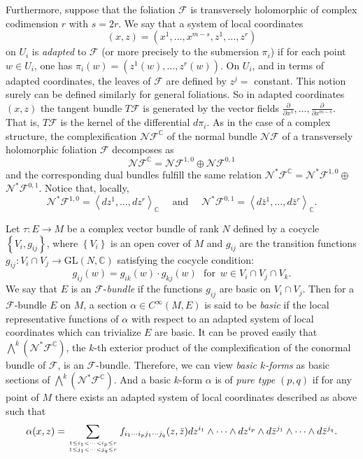 \documentclass[12pt]{amsart}
\numberwithin{equation}{section}
\theoremstyle{definition}
\theoremstyle{definition}
\theoremstyle{definition}
\renewcommand{\1}{\mathsf{1}}
\renewcommand{\>}{\rightarrow}
\def\b{\bar}
\def\mb{\mathbb}
\def\mc{\mathcal}
\theoremstyle{plain} %
\theoremstyle{plain} %
\theoremstyle{plain} %
\begin{document}
	Furthermore,  suppose that  the foliation $\mathcal{F}$ is transversely holomorphic of complex codimension $r$ with $s=2r$. We say that a system of local coordinates  $$(x,z)=\left(x^{1}, \ldots, x^{m-s}, z^{1}, \ldots, z^{r}\right)$$  on $U_i$ is  \textit{adapted} to $\mc F$ (or more precisely to the submersion $\pi_{i}$) if for each point $w\in U_i$, one has $\pi_{i}(w)=\left(z^1(w),\ldots, z^{r}(w)\right)$. On $U_{i}$, and in terms of adapted coordinates, the leaves of $\mathcal{F}$ are defined by $z^{j}=$ constant.
	This notion surely can be defined similarly for general foliations. So in adapted coordinates $(x, z)$ the tangent bundle $T \mathcal{F}$ is generated by the vector fields $\frac{\partial}{\partial x^{1}}, \ldots, \frac{\partial}{\partial x^{m-s}} .$ That is, $T \mathcal{F}$ is the kernel of the differential $d \pi_{i}$. As in the case of a complex structure, the complexification $\mathcal N \mathcal{F}^{\mb C}$ of the normal bundle $\mathcal N \mathcal{F}$ of a transversely holomorphic foliation $\mathcal{F}$ decomposes as
	$$
	\mathcal N \mathcal{F}^{\mb C}=\mathcal N \mathcal{F}^{1,0} \oplus \mathcal N \mathcal{F}^{0,1}
	$$
	and the corresponding dual bundles fulfill the same relation $\mathcal N^{*} \mathcal{F}^{\mb C}=\mathcal N^{*}  \mathcal{F}^{1,0} \oplus$ $\mathcal N^{*}\mathcal{F}^{0,1}$. Notice that, locally,
	$$
	\mathcal N^{*} \mathcal{F}^{1,0}=\left\langle d z^{1}, \ldots, d z^{r}\right\rangle_{\mathbb{C}} \quad \text { and } \quad \mathcal N^{*} \mathcal{F}^{0,1}=\left\langle d \bar{z}^{1}, \ldots, d \bar{z}^{r}\right\rangle_{\mathbb{C}}.
	$$

Let $\tau:E\rightarrow M$ be a complex vector bundle of rank $N$ defined by a cocycle $\left\{V_i,g_{ij}\right\}$, where $\left\{V_i\right\}$ is an open cover of $M$ and ${g_{ij}}$ are the transition  functions $g_{ij}:V_i\cap V_j\rightarrow\text{GL}(N,\mathbb C)$ satisfying the cocycle condition:
	$$g_{ij}(w)=g_{ik}(w)\cdot g_{kj}(w) \,\,\text{ for }\, w\in V_i\cap V_j\cap V_k.$$
	We say that $E$ is an $\mathcal{F}$-\textit{bundle} if the functions $g_{ij}$ are basic on $V_i\cap V_j.$
	Then for a $\mathcal F$-bundle $E$ on $M$, a section $\alpha\in C^\infty(M,E)$ is said to be  \textit{basic} if the local representative functions of $\alpha$ with respect to an adapted system of local coordinates  which can trivialize $E$ are basic. It can be proved easily that $\bigwedge^{k} (\mathcal N^{*} \mathcal{F}^{\mb C})$, the $k$-th exterior product of the complexification of the conormal bundle of $\mathcal{F}$,   is an $\mathcal{F}$-bundle. Therefore, we can view \emph{basic $k$-forms}  as basic sections of $\bigwedge^{k} (\mathcal N^{*} \mathcal{F}^{\mb C})$. And a basic $k$-form $\alpha$ is
	of \emph{pure type $(p, q)$} if for any point of $M$ there exists an adapted system of local coordinates described as above  such that
	\begin{equation*} \label{foliation explicit}
		\alpha(x,z)= \sum_{1\leq i_1<\cdots<i_p\leq r\atop 1\leq j_1<\cdots<j_q\leq r}f_{i_1\cdots
			i_p {j_1}\cdots {j_q}}(z,\b z)d z^{i_{1}} \wedge \cdots \wedge d z^{i_{p}} \wedge d \bar{z}^{j_{1}} \wedge \cdots \wedge d \bar{z}^{j_{q}}.
	\end{equation*}
\end{document}
